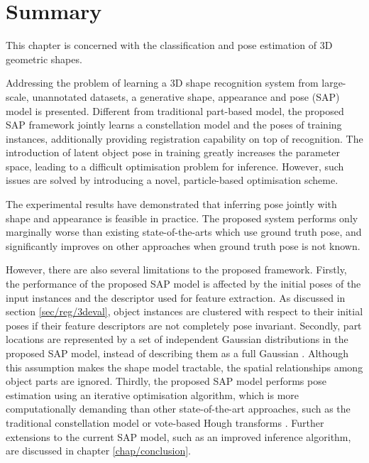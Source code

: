\section{Summary}
\label{sec/reg/conclusions}

This chapter is concerned with the classification and pose estimation of 3D geometric shapes. 

Addressing the problem of learning a 3D shape recognition system from large-scale, unannotated datasets, a generative shape, appearance and pose (SAP) model is presented. Different from traditional part-based model, the proposed SAP framework jointly learns a constellation model and the poses of training instances, additionally providing registration capability on top of recognition. The introduction of latent object pose in training greatly increases the parameter space, leading to a difficult optimisation problem for inference. However, such issues are solved by introducing a novel, particle-based optimisation scheme.  

The experimental results have demonstrated that inferring pose jointly with shape and appearance is feasible in practice. The proposed system performs only marginally worse than existing state-of-the-arts which use ground truth pose, and significantly improves on other approaches when ground truth pose is not known.  

However, there are also several limitations to the proposed framework.
Firstly, the performance of the proposed SAP model is affected by the initial poses of the input instances and the descriptor used for feature extraction. As discussed in section \ref{sec/reg/3deval}, object instances are clustered with respect to their initial poses if their feature descriptors are not completely pose invariant.  
Secondly, part locations are represented by a set of independent Gaussian distributions in the proposed SAP model, instead of describing them as a full Gaussian \cite{Fergus2007}. Although this assumption makes the shape model tractable, the spatial relationships among object parts are ignored. 
Thirdly, the proposed SAP model performs pose estimation using an iterative optimisation algorithm, which is more computationally demanding than other state-of-the-art approaches, such as the traditional constellation model \cite{Weber2000, Fergus2007} or vote-based Hough transforms \cite{Barinova2010, Woodford2013}. 
Further extensions to the current SAP model, such as an improved inference algorithm, are discussed in chapter \ref{chap/conclusion}. 

